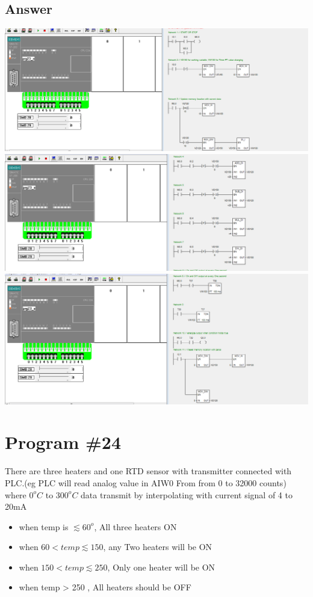 \documentclass[
	12pt, %
]{fphw}
\begin{document}
\subsection*{Answer}
\begin{center}
\includegraphics[width = 165mm, scale =0.9]{prg23u1.png}
\includegraphics[width = 165mm, scale =0.9]{prg23u2.png}
\includegraphics[width = 165mm, scale =0.9]{prg23u3.png}
\end{center}
\section*{Program \#24}
\begin{problem}
 There are three heaters and one RTD sensor with transmitter connected with
 PLC.(eg PLC will read analog value in AIW0 From from 0 to 32000 counts)
 where $0^o C$ to $300^o C$ data transmit by interpolating with current signal of 4 to 20mA  \medskip
 \begin{itemize}
 \item when temp is $\lesssim 60^o$, All three heaters ON
 \item when $60 < temp \lesssim 150$, any Two heaters will be ON
 \item when $150 < temp \lesssim 250$, Only one heater will be ON
 \item when temp > 250 , All heaters should be OFF
 \end{itemize}
\end{problem}
\end{document}
